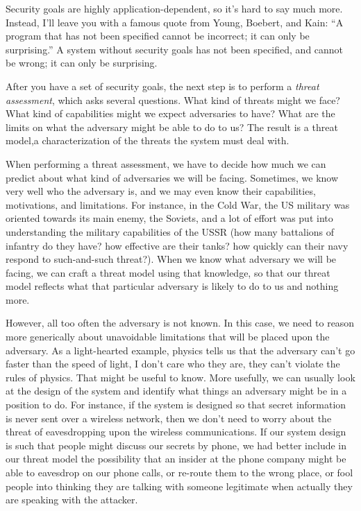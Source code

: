 \documentclass[11pt]{article}
\begin{document}
Security
goals are highly application-dependent, so it's hard to say much
more. Instead, I'll leave you with a famous quote from Young, Boebert,
and Kain: ``A program that has not been specified cannot be incorrect;
it can only be surprising.'' A system without security goals has not
been specified, and cannot be wrong; it can only be surprising. 

After
you have a set of security goals, the next step is to perform a 
{\em threat assessment}, which asks several questions. What kind of threats might
we face? What kind of capabilities might we expect adversaries to
have? What are the limits on what the adversary might be able to do to
us? The result is a threat model,a characterization of the threats the
system must deal with. 

When performing a threat assessment, we have
to decide how much we can predict about what kind of adversaries we
will be facing. Sometimes, we know very well who the adversary is, and
we may even know their capabilities, motivations, and limitations. For
instance, in the Cold War, the US military was oriented towards its
main enemy, the Soviets, and a lot of effort was put into
understanding the military capabilities of the USSR (how many
battalions of infantry do they have? how effective are their tanks?
how quickly can their navy respond to such-and-such threat?). When we
know what adversary we will be facing, we can craft a threat model
using that knowledge, so that our threat model reflects what that
particular adversary is likely to do to us and nothing
more.

However, all too often the adversary is not known. In this
case, we need to reason more generically about unavoidable limitations
that will be placed upon the adversary. As a light-hearted example,
physics tells us that the adversary can't go faster than the speed of
light, I don't care who they are, they can't violate the rules of
physics. That might be useful to know. More usefully, we can usually
look at the design of the system and identify what things an adversary
might be in a position to do. For instance, if the system is designed
so that secret information is never sent over a wireless network, then
we don't need to worry about the threat of eavesdropping upon the
wireless communications. If our system design is such that people
might discuss our secrets by phone, we had better include in our
threat model the possibility that an insider at the phone company
might be able to eavesdrop on our phone calls, or re-route them to the
wrong place, or fool people into thinking they are talking with
someone legitimate when actually they are speaking with the
attacker. 
\end{document}
